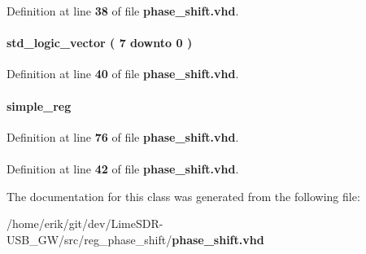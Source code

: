 Definition at line {\bf 38} of file {\bf phase\+\_\+shift.\+vhd}.

\paragraph[{reg\+\_\+sel\+\_\+int}]{ {\bfseries \textcolor{comment}{std\+\_\+logic\+\_\+vector}\textcolor{vhdlchar}{ }\textcolor{vhdlchar}{(}\textcolor{vhdlchar}{ }\textcolor{vhdlchar}{ } \textcolor{vhdldigit}{7} \textcolor{vhdlchar}{ }\textcolor{keywordflow}{downto}\textcolor{vhdlchar}{ }\textcolor{vhdlchar}{ } \textcolor{vhdldigit}{0} \textcolor{vhdlchar}{ }\textcolor{vhdlchar}{)}\textcolor{vhdlchar}{ }} \hspace{0.3cm}{\ttfamily [Signal]}}\label{classphase__shift_1_1arch_a76e701e5e347ff868b8d190a2d88f0cc}


Definition at line {\bf 40} of file {\bf phase\+\_\+shift.\+vhd}.

\paragraph[{regx}]{ {\bfseries \textcolor{vhdlchar}{simple\+\_\+reg}\textcolor{vhdlchar}{ }} \hspace{0.3cm}{\ttfamily [Instantiation]}}\label{classphase__shift_1_1arch_a5e4f256f48c02dcfe6b795717c874fce}


Definition at line {\bf 76} of file {\bf phase\+\_\+shift.\+vhd}.

\paragraph[{simple\+\_\+reg}]{ {\bfseries \textcolor{vhdlchar}{ }} \hspace{0.3cm}{\ttfamily [Component]}}\label{classphase__shift_1_1arch_a4138d86822a655d1fceb6995f94ad18d}


Definition at line {\bf 42} of file {\bf phase\+\_\+shift.\+vhd}.



The documentation for this class was generated from the following file\+:\begin{DoxyCompactItemize}
\item 
/home/erik/git/dev/\+Lime\+S\+D\+R-\/\+U\+S\+B\+\_\+\+G\+W/src/reg\+\_\+phase\+\_\+shift/{\bf phase\+\_\+shift.\+vhd}\end{DoxyCompactItemize}
